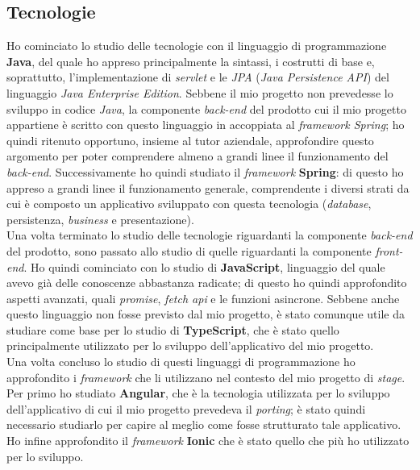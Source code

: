 
\subsection{Tecnologie}
Ho cominciato lo studio delle tecnologie con il linguaggio di programmazione \textbf{Java}, del quale ho appreso principalmente la sintassi, i costrutti di base e, soprattutto, l'implementazione di \textit{servlet} e le \textit{JPA} (\textit{Java Persistence API}) del linguaggio \textit{Java Enterprise Edition}. Sebbene il mio progetto non prevedesse lo sviluppo in codice \textit{Java}, la componente \textit{back-end} del prodotto cui il mio progetto appartiene è scritto con questo linguaggio in accoppiata al \textit{framework Spring}; ho quindi ritenuto opportuno, insieme al tutor aziendale, approfondire questo argomento per poter comprendere almeno a grandi linee il funzionamento del \textit{back-end}. Successivamente ho quindi studiato il \textit{framework} \textbf{Spring}: di questo ho appreso a grandi linee il funzionamento generale, comprendente i diversi strati da cui è composto un applicativo sviluppato con questa tecnologia (\textit{database}, persistenza, \textit{business} e presentazione). \\
Una volta terminato lo studio delle tecnologie riguardanti la componente \textit{back-end} del prodotto, sono passato allo studio di quelle riguardanti la componente \textit{front-end}. Ho quindi cominciato con lo studio di \textbf{JavaScript}, linguaggio del quale avevo già delle conoscenze abbastanza radicate; di questo ho quindi approfondito aspetti avanzati, quali \textit{promise}, \textit{fetch api} e le funzioni asincrone. Sebbene anche questo linguaggio non fosse previsto dal mio progetto, è stato comunque utile da studiare come base per lo studio di \textbf{TypeScript}, che è stato quello principalmente utilizzato per lo sviluppo dell'applicativo del mio progetto. \\
Una volta concluso lo studio di questi linguaggi di programmazione ho approfondito i \textit{framework} che li utilizzano nel contesto del mio progetto di \textit{stage}. Per primo ho studiato \textbf{Angular}, che è la tecnologia utilizzata per lo sviluppo dell'applicativo di cui il mio progetto prevedeva il \textit{porting}; è stato quindi necessario studiarlo per capire al meglio come fosse strutturato tale applicativo. Ho infine approfondito il \textit{framework} \textbf{Ionic} che è stato quello che più ho utilizzato per lo sviluppo. \\
